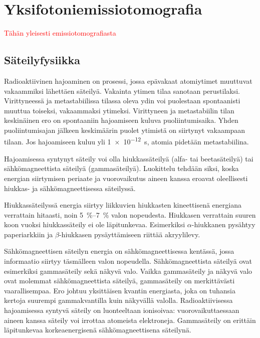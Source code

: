 \section{Yksifotoniemissiotomografia}
\textcolor{red}{Tähän yleisesti emissiotomografiasta}
\subsection{Säteilyfysiikka}
Radioaktiivinen hajoaminen on prosessi, jossa epävakaat atomiytimet muuttuvat vakaammiksi lähettäen säteilyä. Vakainta ytimen tilaa sanotaan perustilaksi. Virittyneessä ja metastabiilissa tilassa oleva ydin voi puolestaan spontaanisti muuttua toiseksi, vakaammaksi ytimeksi. Virittyneen ja metastabiilin tilan keskinäinen ero on spontaaniin hajoamiseen kuluva puoliintumisaika. Yhden puoliintumisajan jälkeen keskimäärin puolet ytimistä on siirtynyt vakaampaan tilaan. Jos hajoamiseen kuluu yli \qty{1e-12}{\second}, atomia pidetään metastabiilina\cite{cherry_basic_2012}.

Hajoamisessa syntynyt säteily voi olla hiukkassäteilyä (alfa- tai beetasäteilyä) tai sähkömagneettista säteilyä (gammasäteilyä).\cite{cherry_basic_2012, cherry_interaction_2012} Luokittelu tehdään siksi, koska energian siirtymisen periaate ja vuorovaikutus aineen kanssa eroavat oleellisesti hiukkas- ja sähkömagneettisessa säteilyssä.

Hiukkassäteilyssä energia siirtyy liikkuvien hiukkasten kineettisenä energiana verrattain hitaasti, noin \qtyrange{5}{7}{\percent} valon nopeudesta. Hiukkasen verrattain suuren koon vuoksi hiukkassäteily ei ole läpitunkevaa. Esimerkiksi $\alpha$-hiukkanen pysähtyy paperiarkkiin ja $\beta$-hiukkasen pysäyttämiseen riittää akryylilevy.\cite{cherry_interaction_2012}

Sähkömagneettisen säteilyn energia on sähkömagneettisessa kentässä, jossa informaatio siirtyy täsmälleen valon nopeudella.\cite{cherry_basic_2012} Sähkömagneettista säteilyä ovat esimerkiksi gammasäteily sekä näkyvä valo. Vaikka gammasäteily ja näkyvä valo ovat molemmat sähkömagneettista säteilyä, gammasäteily on merkittävästi vaarallisempaa. Ero johtuu yksittäisen kvantin energiasta, joka on tuhansia kertoja suurempi gammakvantilla kuin näkyvällä valolla. Radioaktiivisessa hajoamisessa syntyvä säteily on luonteeltaan ionisoivaa: vuorovaikuttaessaan aineen kanssa säteily voi irrottaa atomeista elektroneja\cite{cherry_interaction_2012}. Gammasäteily on erittäin läpitunkevaa korkeaenergisenä sähkömagneettisena säteilynä.

